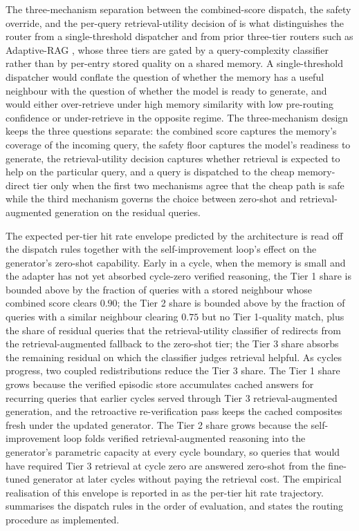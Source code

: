 The three-mechanism separation between the combined-score dispatch, the safety override, and the per-query retrieval-utility decision of  is what distinguishes the router from a single-threshold dispatcher and from prior three-tier routers such as Adaptive-RAG \cite{jeong2024adaptive}, whose three tiers are gated by a query-complexity classifier rather than by per-entry stored quality on a shared memory. A single-threshold dispatcher would conflate the question of whether the memory has a useful neighbour with the question of whether the model is ready to generate, and would either over-retrieve under high memory similarity with low pre-routing confidence or under-retrieve in the opposite regime. The three-mechanism design keeps the three questions separate: the combined score captures the memory's coverage of the incoming query, the safety floor captures the model's readiness to generate, the retrieval-utility decision captures whether retrieval is expected to help on the particular query, and a query is dispatched to the cheap memory-direct tier only when the first two mechanisms agree that the cheap path is safe while the third mechanism governs the choice between zero-shot and retrieval-augmented generation on the residual queries.

The expected per-tier hit rate envelope predicted by the architecture is read off the dispatch rules together with the self-improvement loop's effect on the generator's zero-shot capability. Early in a cycle, when the memory is small and the adapter has not yet absorbed cycle-zero verified reasoning, the Tier 1 share is bounded above by the fraction of queries with a stored neighbour whose combined score clears $0.90$; the Tier 2 share is bounded above by the fraction of queries with a similar neighbour clearing $0.75$ but no Tier 1-quality match, plus the share of residual queries that the retrieval-utility classifier of  redirects from the retrieval-augmented fallback to the zero-shot tier; the Tier 3 share absorbs the remaining residual on which the classifier judges retrieval helpful. As cycles progress, two coupled redistributions reduce the Tier 3 share. The Tier 1 share grows because the verified episodic store accumulates cached answers for recurring queries that earlier cycles served through Tier 3 retrieval-augmented generation, and the retroactive re-verification pass keeps the cached composites fresh under the updated generator. The Tier 2 share grows because the self-improvement loop folds verified retrieval-augmented reasoning into the generator's parametric capacity at every cycle boundary, so queries that would have required Tier 3 retrieval at cycle zero are answered zero-shot from the fine-tuned generator at later cycles without paying the retrieval cost. The empirical realisation of this envelope is reported in  as the per-tier hit rate trajectory.  summarises the dispatch rules in the order of evaluation, and  states the routing procedure as implemented.

